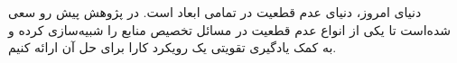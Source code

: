  دنیای امروز، دنیای عدم قطعیت در تمامی ابعاد است. در پژوهش پیش رو سعی شده‌است تا یکی از انواع عدم قطعیت در مسائل تخصیص منابع را شبیه‌سازی کرده و به کمک یادگیری تقویتی یک رویکرد کارا برای حل آن ارائه کنیم.






